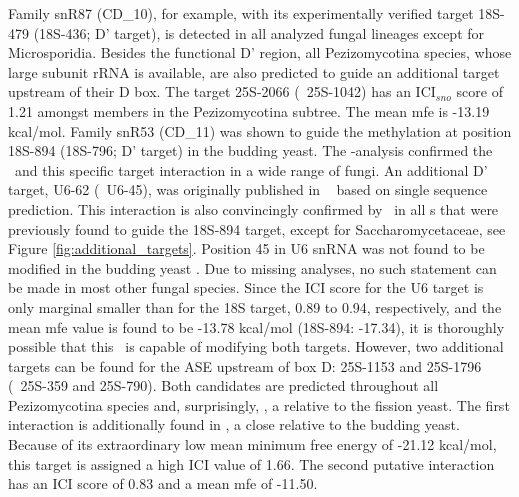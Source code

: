 Family snR87 (CD\_10), for example, with its experimentally verified
target 18S-479 (18S-436; D' target), is detected in all analyzed
fungal lineages except for Microsporidia. Besides the functional D'
region, all Pezizomycotina species, whose large subunit rRNA is
available, are also predicted to guide an additional target upstream
of their D box. The target 25S-2066 (\ncr\ 25S-1042) has an
ICI$_{sno}$ score of 1.21 amongst members in the Pezizomycotina
subtree. The mean mfe is -13.19 kcal/mol.  Family snR53 (CD\_11) was
shown to guide the methylation at position 18S-894 (18S-796; D'
target) in the budding yeast. The \snostrip-analysis confirmed the
\sno\ and this specific target interaction in a wide range of
fungi. An additional D' target, U6-62 (\sce\ U6-45), was originally
published in \ncr\ \cite{Liu:2009} based on single sequence
prediction. This interaction is also convincingly confirmed by
\snostrip\ in all \sno s that were previously found to guide the
18S-894 target, except for Saccharomycetaceae, see Figure
\ref{fig:additional_targets}. Position 45 in U6 snRNA was not found to
be modified in the budding yeast \cite{Machnicka:2013,
  Massenet:1998}. Due to missing analyses, no such statement can be
made in most other fungal species. Since the ICI score for the U6
target is only marginal smaller than for the 18S target, 0.89 to 0.94,
respectively, and the mean mfe value is found to be -13.78 kcal/mol
(18S-894: -17.34), it is thoroughly possible that this \sno\ is
capable of modifying both targets. However, two additional targets can
be found for the ASE upstream of box D: 25S-1153 and 25S-1796 (\ncr\
25S-359 and 25S-790). Both candidates are predicted throughout all
Pezizomycotina species and, surprisingly, \Tde, a relative to the
fission yeast. The first interaction is additionally found in \Yli, a
close relative to the budding yeast. Because of its extraordinary low
mean minimum free energy of -21.12 kcal/mol, this target is assigned a
high ICI value of 1.66. The second putative interaction has an ICI
score of 0.83 and a mean mfe of -11.50.

